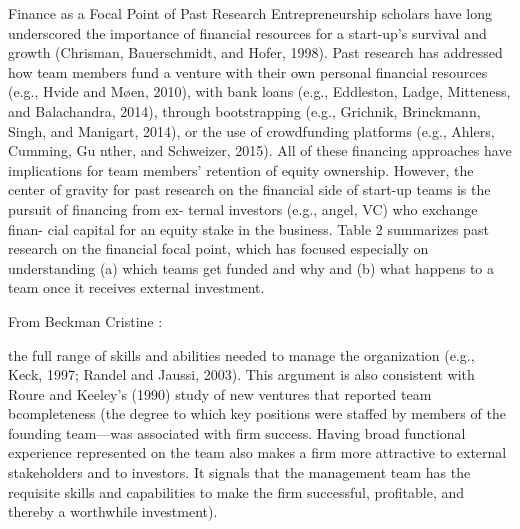 \documentclass[12pt]{article}
\begin{document}
Finance as a Focal Point of Past Research
Entrepreneurship scholars have long underscored the importance of financial resources for a start-up’s survival and growth (Chrisman, Bauerschmidt, and Hofer, 1998). Past research has addressed how team members fund a venture with their own personal financial resources (e.g., Hvide and Møen, 2010), with bank loans (e.g., Eddleston, Ladge, Mitteness, and Balachandra, 2014), through bootstrapping (e.g., Grichnik, Brinckmann, Singh, and Manigart, 2014), or the use of crowdfunding platforms (e.g., Ahlers, Cumming, Gu nther, and Schweizer, 2015). All of these financing approaches have implications for team members’ retention of equity ownership. However, the center of gravity for past research on the financial side of start-up teams is the pursuit of financing from ex- ternal investors (e.g., angel, VC) who exchange finan- cial capital for an equity stake in the business. Table 2 summarizes past research on the financial focal point, which has focused especially on understanding (a) which teams get funded and why and (b) what happens to a team once it receives external investment.

From Beckman Cristine :

the full range of skills and abilities needed to manage the organization (e.g., Keck, 1997; Randel and Jaussi, 2003). This argument is also consistent with Roure and Keeley’s (1990) study of new ventures that reported team bcompleteness (the degree to which key positions were staffed by members of the founding team—was associated with firm success. Having broad functional experience represented on the team also makes a firm more attractive to external stakeholders and to investors. It signals that the management team has the requisite skills and capabilities to make the firm successful, profitable, and thereby a worthwhile investment).
\end{document}
